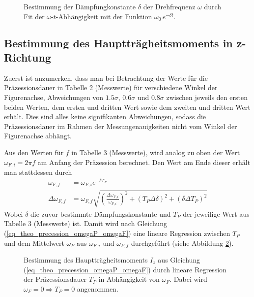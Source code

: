 \documentclass[12pt,a4paper,german]{scrartcl}
\numberwithin{equation}{section}
\begin{document}
  \begin{figure}[H]
    \centering
    
    \caption{Bestimmung der Dämpfungkonstante $\delta$ der Drehfrequenz $\omega$ durch Fit der $\omega$-$t$-Abhängigkeit mit der Funktion $\omega_0 \, e^{-\delta t}$.}
    \label{fig_damping_constant}
  \end{figure}

  \subsection{Bestimmung des Hauptträgheitsmoments in z-Richtung}
  Zuerst ist anzumerken, dass man bei Betrachtung der Werte für die Präzessionsdauer in Tabelle 2 (Messwerte) für verschiedene Winkel der Figurenachse, Abweichungen von $1.5\sigma$, $0.6\sigma$ und $0.8\sigma$ zwischen jeweils den ersten beiden Werten, dem ersten und dritten Wert sowie dem zweiten und dritten Wert erhält.
  Dies sind alles keine signifikanten Abweichungen, sodass die Präzessionsdauer im Rahmen der Messungenauigkeiten nicht vom Winkel der Figurenachse abhängt.

  Aus den Werten für $f$ in Tabelle 3 (Messwerte), wird analog zu oben der Wert $\omega_{F,i} = 2 \pi f$ am Anfang der Präzession berechnet. Den Wert am Ende dieser erhält man stattdessen durch
  \begin{align}
    \omega_{F,f} &= \omega_{F,i} e^{-\delta T_P} \nonumber \\
    \Delta \omega_{F,f} &= \omega_{F,f}
    \sqrt{\left(\frac{\Delta \omega_{F,i}}{\omega_{F,i}} \right)^2
    + (T_P \Delta \delta)^2 + (\delta \Delta T_P)^2}
  \end{align}
  Wobei $\delta$ die zuvor bestimmte Dämpfungskonstante und $T_P$ der jeweilige Wert aus Tabelle 3 (Messwerte) ist.
  Damit wird nach Gleichung (\ref{eq_theo_precession_omegaP_omegaF}) eine lineare Regression zwischen $T_P$ und dem Mittelwert $\omega_F$ aus $\omega_{F,i}$ und $\omega_{F,f}$ durchgeführt (siehe Abbildung \ref{fig_I_z}).

  \begin{figure}[H]
    \centering
    
    \caption{Bestimmung des Hauptträgheitsmoments $I_z$ aus Gleichung (\ref{eq_theo_precession_omegaP_omegaF}) durch lineare Regression der Präzessionsdauer $T_P$ in Abhängigkeit von $\omega_F$. Dabei wird $\omega_F = 0 \Rightarrow T_P = 0$ angenommen.}
    \label{fig_I_z}
  \end{figure}
\end{document}
